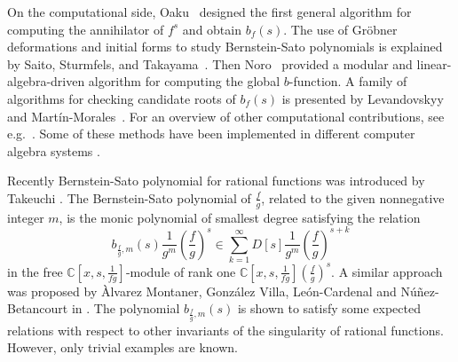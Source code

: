 \documentclass[a4paper,12pt]{amsart}
\theoremstyle{plain}
\theoremstyle{definition}
\theoremstyle{remark}
\def\CC{\mathbb{C}}
\begin{document}
On the computational side, Oaku~\cite{Oak97} designed the first general algorithm for computing the annihilator of $f^s$
and obtain $b_f(s)$. The use of Gr\"obner deformations and initial forms to study Bernstein-Sato polynomials is explained by Saito,
Sturmfels, and Takayama~\cite{SST00}. Then Noro~\cite{Nor02} provided 
a modular and linear-algebra-driven algorithm for computing the global $b$-function. A family of algorithms for checking candidate roots of $b_f(s)$ is presented by Levandovskyy
and Martín-Morales~\cite{LM12}. For an overview of other computational contributions, see e.g.~\cite{Wal15}.
Some of these methods have been implemented in different computer algebra systems \cite{OpenXM, LeTs00, LM10, AL12}.

Recently Bernstein-Sato polynomial for rational functions was introduced by Takeuchi \cite{Tak23}.
The Bernstein-Sato polynomial of $\frac{f}{g}$, related to the given nonnegative integer $m$, is the monic polynomial of smallest degree satisfying the 
relation
\begin{equation*}%
b_{\frac{f}{g},m}^{}(s) \frac{1}{g^m} \left( \frac{f}{g} \right)^s \in
\sum_{k = 1}^\infty D[s] \frac{1}{g^m} \left( \frac{f}{g} \right)^{s+k}
\end{equation*}
in the free $\CC[x,s,\frac{1}{fg}]$-module of rank one $\CC[x,s,\frac{1}{fg}] \left( \frac{f}{g} \right)^s$.
A similar approach was proposed by Àlvarez Montaner, González Villa, León-Cardenal and Núñez-Betancourt in \cite{AGLN21}. The polynomial $b_{\frac{f}{g},m}(s)$ is shown to satisfy
some expected relations with respect to other invariants of the singularity of rational functions.
However, only trivial examples are known.
\end{document}

